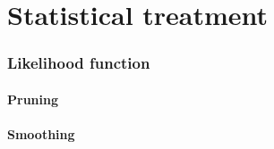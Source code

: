 \chapter{Statistical treatment}

\subsection{Likelihood function}

\subsubsection{Pruning}
\subsubsection{Smoothing}



